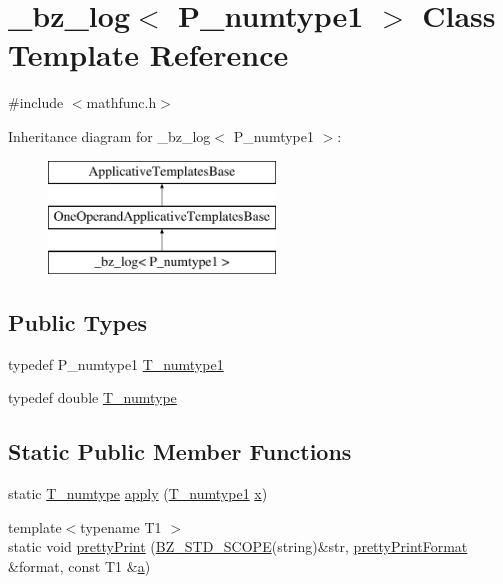 \hypertarget{class__bz__log}{}\section{\+\_\+bz\+\_\+log$<$ P\+\_\+numtype1 $>$ Class Template Reference}
\label{class__bz__log}


{\ttfamily \#include $<$mathfunc.\+h$>$}

Inheritance diagram for \+\_\+bz\+\_\+log$<$ P\+\_\+numtype1 $>$\+:\begin{figure}[H]
\begin{center}
\leavevmode
\includegraphics[height=3.000000cm]{class__bz__log}
\end{center}
\end{figure}
\subsection*{Public Types}
\begin{DoxyCompactItemize}
\item 
typedef P\+\_\+numtype1 \hyperlink{class__bz__log_acfe054842020c29db6f749194b53320f}{T\+\_\+numtype1}
\item 
typedef double \hyperlink{class__bz__log_a532484f046bb38c362de58c1ba50f283}{T\+\_\+numtype}
\end{DoxyCompactItemize}
\subsection*{Static Public Member Functions}
\begin{DoxyCompactItemize}
\item 
static \hyperlink{class__bz__log_a532484f046bb38c362de58c1ba50f283}{T\+\_\+numtype} \hyperlink{class__bz__log_ac903851e028b60b862b8aa010ff1e266}{apply} (\hyperlink{class__bz__log_acfe054842020c29db6f749194b53320f}{T\+\_\+numtype1} \hyperlink{vecnorm1_8cc_ac73eed9e41ec09d58f112f06c2d6cb63}{x})
\item 
{\footnotesize template$<$typename T1 $>$ }\\static void \hyperlink{class__bz__log_a3e7a332f83bb30a323646d116b52d469}{pretty\+Print} (\hyperlink{numinquire_8h_a2b24ffc3b4ef9803956bc7715c6c7b83}{B\+Z\+\_\+\+S\+T\+D\+\_\+\+S\+C\+O\+P\+E}(string)\&str, \hyperlink{classprettyPrintFormat}{pretty\+Print\+Format} \&format, const T1 \&\hyperlink{gen__mat5files_8m_aae328bf20413f220e38aec4d95bfd6da}{a})
\end{DoxyCompactItemize}


